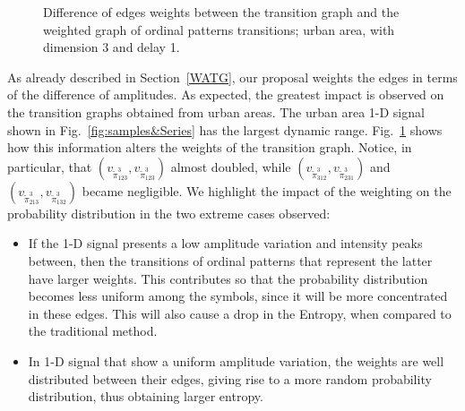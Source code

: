 \documentclass[journal]{IEEEtran}
\begin{document}
\begin{figure}[hbt]
	\centering
	\caption{Difference of edges weights between the transition graph and the weighted graph of ordinal patterns transitions; urban area, with dimension 3 and delay 1.}
	\label{fig:graphs}
\end{figure}



As already described in Section~\ref{WATG}, our proposal weights the edges in terms of the difference of amplitudes.
As expected, the greatest impact is observed on the transition graphs obtained from urban areas.
The urban area \mbox{1-D} signal shown in Fig.~\ref{fig:samples&Series} has the largest dynamic range.
Fig.~\ref{fig:graphs} shows how this information alters the weights of the transition graph.
Notice, in particular, that 
$(v_{\widetilde \pi^3_{123}}, v_{\widetilde \pi^3_{123}})$ almost doubled, while 
$(v_{\widetilde \pi^3_{312}}, v_{\widetilde \pi^3_{231}})$ and $(v_{\widetilde \pi^3_{213}}, v_{\widetilde \pi^3_{132}})$ became negligible.
We highlight the impact of the weighting on the probability distribution in the two extreme cases observed:
\begin{itemize}
	\item If the \mbox{1-D} signal presents a low amplitude variation and intensity peaks between, then the transitions of ordinal patterns that represent the latter have larger weights.
	This contributes so that the probability distribution becomes less uniform among the symbols, since it will be more concentrated in these edges.
	This will also cause a drop in the Entropy, when compared to the traditional method.
	\item In \mbox{1-D} signal that show a uniform amplitude variation, the weights are well distributed between their edges, giving rise to a more random probability distribution, thus obtaining larger entropy.
\end{itemize}
\end{document}
